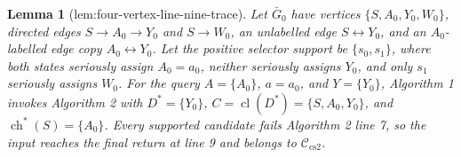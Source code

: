 \documentclass{article}
\newtheorem{lemma}{Lemma}
\begin{document}
\begin{lemma}[lem:four-vertex-line-nine-trace]\label{lem:four-vertex-line-nine-trace}
Let \(\bar G_0\) have vertices \(\{S,A_0,Y_0,W_0\}\), directed edges \(S\to A_0\to Y_0\) and \(S\to W_0\), an unlabelled edge \(S\leftrightarrow Y_0\), and an \(A_0\)-labelled edge copy \(A_0\leftrightarrow Y_0\). Let the positive selector support be \(\{s_0,s_1\}\), where both states seriously assign \(A_0=a_0\), neither seriously assigns \(Y_0\), and only \(s_1\) seriously assigns \(W_0\). For the query \(A=\{A_0\}\), \(a=a_0\), and \(Y=\{Y_0\}\), Algorithm 1 invokes Algorithm 2 with \(D^\ast=\{Y_0\}\), \(C=\operatorname{cl}(D^\ast)=\{S,A_0,Y_0\}\), and \(\operatorname{ch}^\ast(S)=\{A_0\}\). Every supported candidate fails Algorithm 2 line 7, so the input reaches the final return at line 9 and belongs to \(\mathcal C_{\mathrm{cs2}}\).
\end{lemma}
\end{document}
